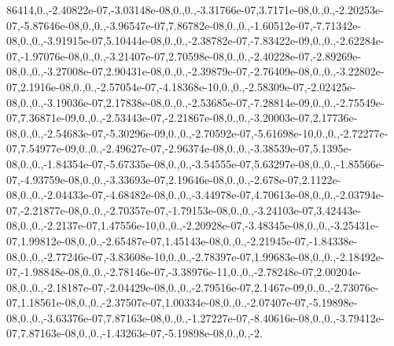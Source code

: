 {86414,0.,-\/2.\-40822e-\/07,-\/3.\-03148e-\/08,0.,0.,-\/3.\-31766e-\/07,3.\-7171e-\/08,0.,0.,-\/2.\-20253e-\/07,-\/5.\-87646e-\/08,0.,0.,-\/3.\-96547e-\/07,7.\-86782e-\/08,0.,0.,-\/1.\-60512e-\/07,-\/7.\-71342e-\/08,0.,0.,-\/3.\-91915e-\/07,5.\-10444e-\/08,0.,0.,-\/2.\-38782e-\/07,-\/7.\-83422e-\/09,0.,0.,-\/2.\-62284e-\/07,-\/1.\-97076e-\/08,0.,0.,-\/3.\-21407e-\/07,2.\-70598e-\/08,0.,0.,-\/2.\-40228e-\/07,-\/2.\-89269e-\/08,0.,0.,-\/3.\-27008e-\/07,2.\-90431e-\/08,0.,0.,-\/2.\-39879e-\/07,-\/2.\-76409e-\/08,0.,0.,-\/3.\-22802e-\/07,2.\-1916e-\/08,0.,0.,-\/2.\-57054e-\/07,-\/4.\-18368e-\/10,0.,0.,-\/2.\-58309e-\/07,-\/2.\-02425e-\/08,0.,0.,-\/3.\-19036e-\/07,2.\-17838e-\/08,0.,0.,-\/2.\-53685e-\/07,-\/7.\-28814e-\/09,0.,0.,-\/2.\-75549e-\/07,7.\-36871e-\/09,0.,0.,-\/2.\-53443e-\/07,-\/2.\-21867e-\/08,0.,0.,-\/3.\-20003e-\/07,2.\-17736e-\/08,0.,0.,-\/2.\-54683e-\/07,-\/5.\-30296e-\/09,0.,0.,-\/2.\-70592e-\/07,-\/5.\-61698e-\/10,0.,0.,-\/2.\-72277e-\/07,7.\-54977e-\/09,0.,0.,-\/2.\-49627e-\/07,-\/2.\-96374e-\/08,0.,0.,-\/3.\-38539e-\/07,5.\-1395e-\/08,0.,0.,-\/1.\-84354e-\/07,-\/5.\-67335e-\/08,0.,0.,-\/3.\-54555e-\/07,5.\-63297e-\/08,0.,0.,-\/1.\-85566e-\/07,-\/4.\-93759e-\/08,0.,0.,-\/3.\-33693e-\/07,2.\-19646e-\/08,0.,0.,-\/2.\-678e-\/07,2.\-1122e-\/08,0.,0.,-\/2.\-04433e-\/07,-\/4.\-68482e-\/08,0.,0.,-\/3.\-44978e-\/07,4.\-70613e-\/08,0.,0.,-\/2.\-03794e-\/07,-\/2.\-21877e-\/08,0.,0.,-\/2.\-70357e-\/07,-\/1.\-79153e-\/08,0.,0.,-\/3.\-24103e-\/07,3.\-42443e-\/08,0.,0.,-\/2.\-2137e-\/07,1.\-47556e-\/10,0.,0.,-\/2.\-20928e-\/07,-\/3.\-48345e-\/08,0.,0.,-\/3.\-25431e-\/07,1.\-99812e-\/08,0.,0.,-\/2.\-65487e-\/07,1.\-45143e-\/08,0.,0.,-\/2.\-21945e-\/07,-\/1.\-84338e-\/08,0.,0.,-\/2.\-77246e-\/07,-\/3.\-83608e-\/10,0.,0.,-\/2.\-78397e-\/07,1.\-99683e-\/08,0.,0.,-\/2.\-18492e-\/07,-\/1.\-98848e-\/08,0.,0.,-\/2.\-78146e-\/07,-\/3.\-38976e-\/11,0.,0.,-\/2.\-78248e-\/07,2.\-00204e-\/08,0.,0.,-\/2.\-18187e-\/07,-\/2.\-04429e-\/08,0.,0.,-\/2.\-79516e-\/07,2.\-1467e-\/09,0.,0.,-\/2.\-73076e-\/07,1.\-18561e-\/08,0.,0.,-\/2.\-37507e-\/07,1.\-00334e-\/08,0.,0.,-\/2.\-07407e-\/07,-\/5.\-19898e-\/08,0.,0.,-\/3.\-63376e-\/07,7.\-87163e-\/08,0.,0.,-\/1.\-27227e-\/07,-\/8.\-40616e-\/08,0.,0.,-\/3.\-79412e-\/07,7.\-87163e-\/08,0.,0.,-\/1.\-43263e-\/07,-\/5.\-19898e-\/08,0.,0.,-\/2.\-}
